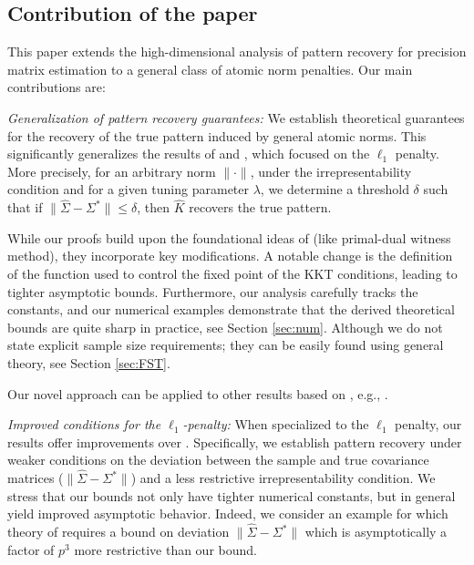 \documentclass[12pt]{amsart}
\numberwithin{equation}{section}
\numberwithin{equation}{section}
\theoremstyle{definition}
\begin{document}
\subsection{Contribution of the paper}
This paper extends the high-dimensional analysis of pattern recovery for precision matrix estimation to a general class of atomic norm penalties. Our main contributions are:

\emph{Generalization of pattern recovery guarantees:} We establish theoretical guarantees for the recovery of the true pattern induced by general atomic norms. This significantly generalizes the results of  \cite{Ravi2008} and \cite{ravikumar2011graphical}, which focused
on the $\ell_1$ penalty. More precisely, for an arbitrary norm $\|\cdot\|$, under the irrepresentability condition and for a given tuning parameter $\lambda$, we determine a threshold $\delta$ such that  if $\| \hat{\Sigma}-\Sigma^\ast\|\leq \delta$, then $\hat{K}$ recovers the true pattern. 

While our proofs build upon the foundational ideas of \cite{ravikumar2011graphical} (like primal-dual witness method), they incorporate key modifications. A notable change is the definition of the function used to control the fixed point of the KKT conditions, leading to tighter asymptotic bounds.  Furthermore, our analysis carefully tracks the constants, and our numerical examples demonstrate that the derived theoretical bounds are quite sharp in practice, see Section \ref{sec:num}.
Although we do not state explicit sample size requirements; they can be easily found using general theory, see Section \ref{sec:FST}.

Our novel approach can be applied to other results based on \cite{ravikumar2011graphical}, e.g., \cite{FUN_GLASSO}.


\emph{Improved conditions for the $\ell_1$-penalty:} When specialized to the $\ell_1$ penalty, our results offer improvements over \cite{ravikumar2011graphical}. Specifically, we establish pattern recovery under weaker conditions on the deviation between the sample and true covariance matrices ($\|\hat{\Sigma} - \Sigma^\ast\|$) and a less restrictive irrepresentability condition. We stress that our bounds not only have
tighter numerical constants, but in general yield improved asymptotic behavior. Indeed, we consider an example for which theory of \cite{ravikumar2011graphical} requires a bound on deviation $\| \hat{\Sigma}-\Sigma^\ast\|$ which is asymptotically a factor of $p^3$ more restrictive than our bound. %
\end{document}
